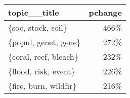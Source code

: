\begin{tabular}{p{2cm}r}
\toprule
          topic\_\_title &  pchange \\
\midrule
    \{soc, stock, soil\} &     466\% \\
  \{popul, genet, gene\} &     272\% \\
 \{coral, reef, bleach\} &     232\% \\
  \{flood, risk, event\} &     226\% \\
 \{fire, burn, wildfir\} &     216\% \\
\bottomrule
\end{tabular}

